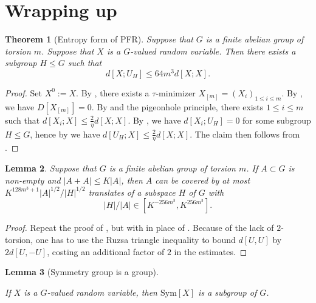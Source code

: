 \documentclass[10pt,a4paper]{article}
\newtheorem{theorem}{Theorem}
\newtheorem{lemma}[theorem]{Lemma}
\newcommand{\lean}[1]{}
\newcommand{\uses}[1]{}
\newcommand{\leanok}{}
\begin{document}
\section{Wrapping up}

\begin{theorem}[Entropy form of PFR]\label{main-entropy}\lean{dist_of_X_U_H_le}\leanok Suppose that $G$ is a finite abelian group of torsion $m$.  Suppose that $X$ is a $G$-valued random variable. Then there exists a subgroup $H \leq G$ such that \[ d[X;U_H] \leq 64 m^3 d[X;X].\]
\end{theorem}

\begin{proof}\uses{k-vanish, ruzsa-triangle, tau-def, multi-zero, eta-def-multi, tau-ref, tau-min-exist-multi}\leanok  Set $X^0 := X$. By , there exists a $\tau$-minimizer $X_{[m]} = (X_i)_{1 \leq i \leq m}$.  By , we have $D[X_{[m]}]=0$. By  and the pigeonhole principle, there exists $1 \leq i \leq m$ such that $d[X_i; X] \leq \frac{2}{\eta} d[X;X]$.  By , we have $d[X_i;U_H]=0$ for some subgroup $H \leq G$, hence by  we have $d[U_H; X] \leq \frac{2}{\eta} d[X;X]$. The claim then follows from .
\end{proof}

\begin{lemma}\label{pfr_aux_torsion}\lean{torsion_PFR_conjecture_aux}\leanok  Suppose that $G$ is a finite abelian group of torsion $m$.  If $A \subset G$ is non-empty and
  $|A+A| \leq K|A|$, then $A$ can be covered by at most $K ^
  {128m^3+1}|A|^{1/2}/|H|^{1/2}$ translates of a subspace $H$ of $G$ with
  \begin{equation}
    \label{ah2}
    |H|/|A| \in [K^{-256m^3}, K^{256m^3}].
  \end{equation}
  \end{lemma}

\begin{proof}\uses{main-entropy, unif-exist, uniform-entropy-II, jensen-bound,ruz-dist-def,ruzsa-diff,bound-conc,ruz-cov}\leanok  Repeat the proof of , but with  in place of .  Because of the lack of $2$-torsion, one has to use the Ruzsa triangle inequality to bound $d[U,U]$ by $2d[U,-U]$, costing an additional factor of $2$ in the estimates.
\end{proof}



\begin{lemma}[Symmetry group is a group]\label{sym-group}\uses{sym-group-def}
\lean{symmGroup}\leanok
If $X$ is a $G$-valued random variable, then $\mathrm{Sym}[X]$ is a subgroup of $G$.
\end{lemma}
\end{document}
